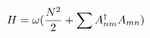 \begin{equation}
H = \omega ( { N^2 \over 2} + \sum A_{nm}^{\dag} A_{mn})
\label{hamiltonian}
\end{equation}

